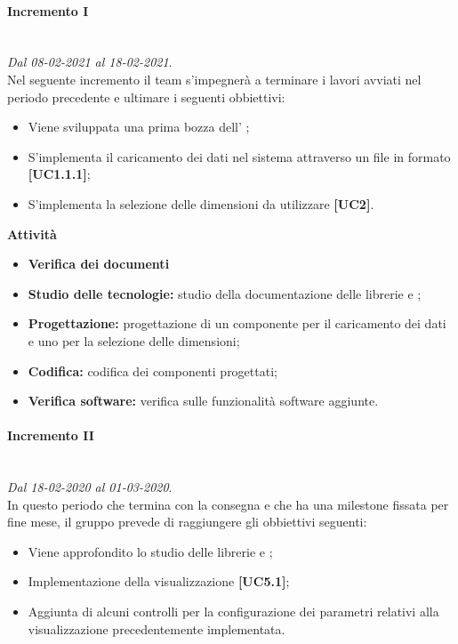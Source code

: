 \paragraph{Incremento I} \textit{}\\ \textit{Dal 08-02-2021 al 18-02-2021}. \\ Nel seguente incremento il team s'impegnerà a terminare i lavori avviati nel periodo precedente e ultimare i seguenti obbiettivi:
		\begin{itemize}
			\item Viene sviluppata una prima bozza dell' ;
			\item S'implementa il caricamento dei dati nel sistema attraverso un file in formato  \textbf{[UC1.1.1]};
			\item S'implementa la selezione delle dimensioni da utilizzare \textbf{[UC2]}.
		\end{itemize}	
		
\textbf{Attività}			

\begin{itemize}
\item \textbf{Verifica dei documenti}
\item \textbf{Studio delle tecnologie:} studio della documentazione delle librerie  e ;
\item \textbf{Progettazione:} progettazione di un componente per il caricamento dei dati e uno per la selezione delle dimensioni;
\item \textbf{Codifica:} codifica dei componenti progettati;
\item \textbf{Verifica software:} verifica sulle funzionalità software aggiunte.
\end{itemize}

\paragraph{Incremento II} \textit{}\\ \textit{Dal 18-02-2020 al 01-03-2020}.\\ In questo periodo che termina con la consegna e che ha una milestone fissata per fine mese, il gruppo prevede di raggiungere gli obbiettivi seguenti:
		\begin{itemize}
			\item Viene approfondito lo studio delle librerie  e ;
			\item Implementazione della visualizzazione  \textbf{[UC5.1]};
			\item Aggiunta di alcuni controlli per la configurazione dei parametri relativi alla visualizzazione precedentemente implementata. 
		\end{itemize}			
	

